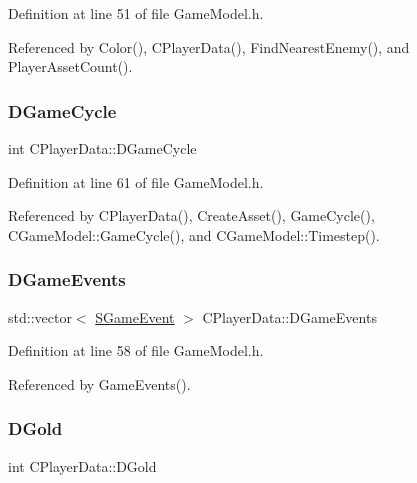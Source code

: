 Definition at line 51 of file Game\+Model.\+h.



Referenced by Color(), C\+Player\+Data(), Find\+Nearest\+Enemy(), and Player\+Asset\+Count().

\hypertarget{classCPlayerData_ae92ca06a63a01681dd9f3ddc17c0e106}{}\label{classCPlayerData_ae92ca06a63a01681dd9f3ddc17c0e106} 
\subsubsection{\texorpdfstring{D\+Game\+Cycle}{DGameCycle}}
{\footnotesize\ttfamily int C\+Player\+Data\+::\+D\+Game\+Cycle\hspace{0.3cm}{\ttfamily [protected]}}



Definition at line 61 of file Game\+Model.\+h.



Referenced by C\+Player\+Data(), Create\+Asset(), Game\+Cycle(), C\+Game\+Model\+::\+Game\+Cycle(), and C\+Game\+Model\+::\+Timestep().

\hypertarget{classCPlayerData_a9a7af43e88055d6d1a384a8817a655a0}{}\label{classCPlayerData_a9a7af43e88055d6d1a384a8817a655a0} 
\subsubsection{\texorpdfstring{D\+Game\+Events}{DGameEvents}}
{\footnotesize\ttfamily std\+::vector$<$ \hyperlink{structSGameEvent}{S\+Game\+Event} $>$ C\+Player\+Data\+::\+D\+Game\+Events\hspace{0.3cm}{\ttfamily [protected]}}



Definition at line 58 of file Game\+Model.\+h.



Referenced by Game\+Events().

\hypertarget{classCPlayerData_afa66ff31262c9b287ae8c13259aae6f3}{}\label{classCPlayerData_afa66ff31262c9b287ae8c13259aae6f3} 
\subsubsection{\texorpdfstring{D\+Gold}{DGold}}
{\footnotesize\ttfamily int C\+Player\+Data\+::\+D\+Gold\hspace{0.3cm}{\ttfamily [protected]}}



